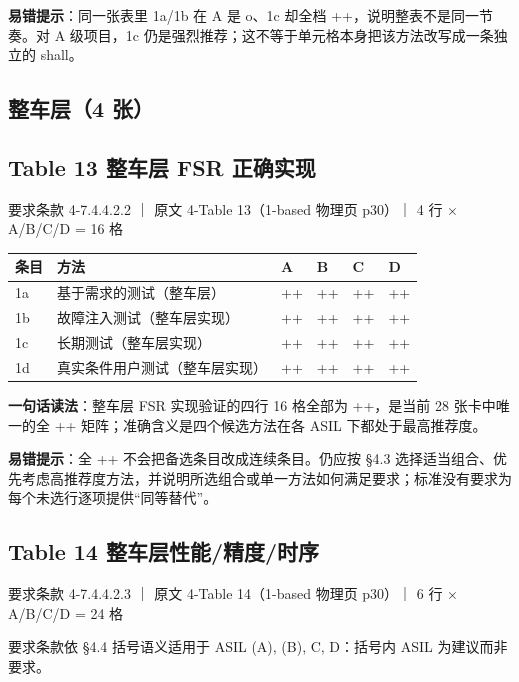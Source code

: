 \textbf{易错提示}：同一张表里 1a/1b 在 A 是 o、1c 却全档 ++，说明整表不是同一节奏。对 A 级项目，1c 仍是强烈推荐；这不等于单元格本身把该方法改写成一条独立的 shall。

\subsection{整车层（4 张）}

\subsection{Table 13 整车层 FSR 正确实现}

要求条款 4-7.4.4.2.2 ｜ 原文 4-Table 13（1-based 物理页 p30）｜ 4 行 \(\times\) A/B/C/D = 16 格

\begin{center}
\begingroup\small
\setlength{\tabcolsep}{4pt}
\begin{tabularx}{\linewidth}{@{}XXXXXX@{}}
\toprule
条目 & 方法 & A & B & C & D \\
\midrule
1a & 基于需求的测试（整车层） & ++ & ++ & ++ & ++ \\
1b & 故障注入测试（整车层实现） & ++ & ++ & ++ & ++ \\
1c & 长期测试（整车层实现） & ++ & ++ & ++ & ++ \\
1d & 真实条件用户测试（整车层实现） & ++ & ++ & ++ & ++ \\
\bottomrule
\end{tabularx}
\endgroup
\end{center}

\textbf{一句话读法}：整车层 FSR 实现验证的四行 16 格全部为 ++，是当前 28 张卡中唯一的全 ++ 矩阵；准确含义是四个候选方法在各 ASIL 下都处于最高推荐度。

\textbf{易错提示}：全 ++ 不会把备选条目改成连续条目。仍应按 §4.3 选择适当组合、优先考虑高推荐度方法，并说明所选组合或单一方法如何满足要求；标准没有要求为每个未选行逐项提供“同等替代”。

\subsection{Table 14 整车层性能/精度/时序}

要求条款 4-7.4.4.2.3 ｜ 原文 4-Table 14（1-based 物理页 p30）｜ 6 行 \(\times\) A/B/C/D = 24 格

\begin{noteblock}
要求条款依 §4.4 括号语义适用于 ASIL (A), (B), C, D：括号内 ASIL 为建议而非要求。
\end{noteblock}


